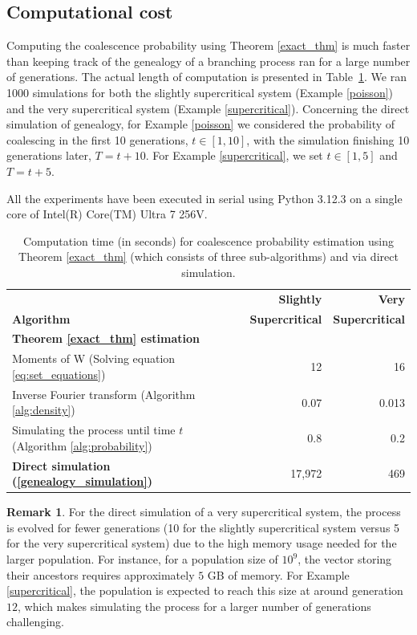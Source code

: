\documentclass[preprint,3p,12pt]{elsarticle}
\theoremstyle{definition}
\newtheorem*{remark}{Remark}
\begin{document}
\subsection{Computational cost} \label{computation}
Computing the coalescence probability using Theorem \ref{exact_thm} is much faster than keeping track of the genealogy of a branching process ran for a large number of generations. The actual length of computation is presented in Table~\ref{table_time}. We ran 1000 simulations for both the slightly supercritical system (Example \ref{poisson}) and the very supercritical system (Example \ref{supercritical}). Concerning the direct simulation of genealogy, for Example \ref{poisson} we considered the probability of coalescing in the first 10 generations, $t \in [1, 10]$, with the simulation finishing 10 generations later, $T = t + 10$. For Example \ref{supercritical}, we set $t \in [1, 5]$ and $T = t + 5$.

All the experiments have been executed in serial using Python 3.12.3 on a single core of Intel(R) Core(TM) Ultra 7 256V.

\begin{table}[ht!]
    \centering
    \caption{Computation time (in seconds) for coalescence probability estimation using Theorem \ref{exact_thm} (which consists of three sub-algorithms) and via direct simulation.}
    \label{table_time}
    \begin{tabular}{l r r} %
       &  \bf Slightly & \bf Very\\
      \bf Algorithm & \bf Supercritical & \bf Supercritical  \\
      \hline
      \bf Theorem \ref{exact_thm} estimation & & \\
        \quad Moments of W (Solving equation \eqref{eq:set_equations})  & 12   & 16   \\ 
        \quad Inverse Fourier transform (Algorithm  \ref{alg:density})  & 0.07   & 0.013   \\ 
        \quad Simulating the process until time $t$ (Algorithm \ref{alg:probability}) & 0.8   & 0.2   \\ 
        \bf Direct simulation (\ref{genealogy_simulation}) & 17,972 & 469 \\ %
    \end{tabular}
\end{table}
\begin{remark}
    For the direct simulation of a very supercritical system, the process is evolved for fewer generations (10 for the slightly supercritical system versus 5 for the very supercritical system) due to the high memory usage needed for the larger population. For instance, for a population size of $10^9$, the vector storing their ancestors requires approximately $5$ GB of memory. For Example \ref{supercritical}, the population is expected to reach this size at around generation $12$, which makes simulating the process for a larger number of generations challenging. 
\end{remark}
\end{document}
